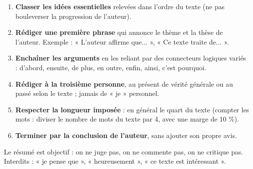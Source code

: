 \documentclass[11pt]{article}
\newcommand{\cle}[1]{{\popxbold\color{popdark}#1}}
\begin{document}
\begin{methode}
\begin{enumerate}
\item \textbf{Classer les idées essentielles} relevées dans l'ordre du texte (ne pas bouleverser la progression de l'auteur).
\item \textbf{Rédiger une première phrase} qui annonce le thème et la thèse de l'auteur. Exemple : « L'auteur affirme que... », « Ce texte traite de... ».
\item \textbf{Enchaîner les arguments} en les reliant par des connecteurs logiques variés : d'abord, ensuite, de plus, en outre, enfin, ainsi, c'est pourquoi.
\item \textbf{Rédiger à la troisième personne}, au présent de vérité générale ou au passé selon le texte ; jamais de « je » personnel.
\item \textbf{Respecter la longueur imposée} : en général le quart du texte (compter les mots : diviser le nombre de mots du texte par 4, avec une marge de 10 \%).
\item \textbf{Terminer par la conclusion de l'auteur}, sans ajouter son propre avis.
\end{enumerate}
\end{methode}

\begin{attention}
Le résumé est \cle{objectif} : on ne juge pas, on ne commente pas, on ne critique pas. Interdits : « je pense que », « heureusement », « ce texte est intéressant ».
\end{attention}
\end{document}
